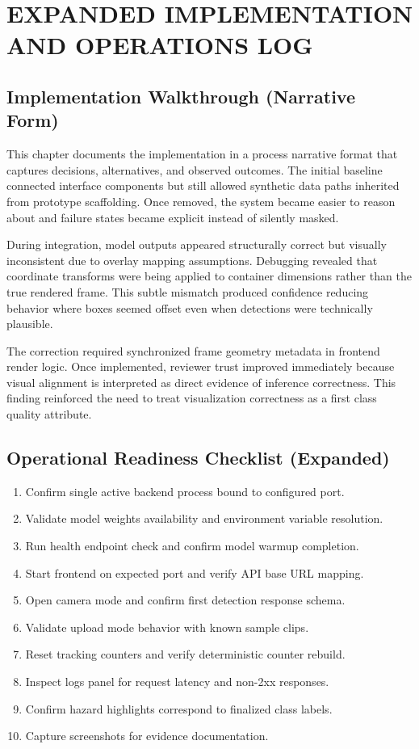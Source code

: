 \documentclass[12pt,a4paper]{report}
\begin{document}
\chapter{EXPANDED IMPLEMENTATION AND OPERATIONS LOG}
\section{Implementation Walkthrough (Narrative Form)}
This chapter documents the implementation in a process narrative format that captures decisions, alternatives, and observed outcomes. The initial baseline connected interface components but still allowed synthetic data paths inherited from prototype scaffolding. Once removed, the system became easier to reason about and failure states became explicit instead of silently masked.

During integration, model outputs appeared structurally correct but visually inconsistent due to overlay mapping assumptions. Debugging revealed that coordinate transforms were being applied to container dimensions rather than the true rendered frame. This subtle mismatch produced confidence reducing behavior where boxes seemed offset even when detections were technically plausible.

The correction required synchronized frame geometry metadata in frontend render logic. Once implemented, reviewer trust improved immediately because visual alignment is interpreted as direct evidence of inference correctness. This finding reinforced the need to treat visualization correctness as a first class quality attribute.

\section{Operational Readiness Checklist (Expanded)}
\begin{enumerate}
    \item Confirm single active backend process bound to configured port.
    \item Validate model weights availability and environment variable resolution.
    \item Run health endpoint check and confirm model warmup completion.
    \item Start frontend on expected port and verify API base URL mapping.
    \item Open camera mode and confirm first detection response schema.
    \item Validate upload mode behavior with known sample clips.
    \item Reset tracking counters and verify deterministic counter rebuild.
    \item Inspect logs panel for request latency and non-2xx responses.
    \item Confirm hazard highlights correspond to finalized class labels.
    \item Capture screenshots for evidence documentation.
\end{enumerate}
\end{document}
